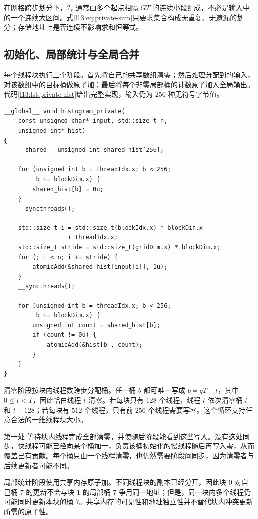 在网格跨步划分下，$\mathcal I_r$ 通常由多个起点相隔 $GT$ 的连续小段组成，不必是输入中的一个连续大区间。式\eqref{l13:eq:private-sum}只要求集合构成无重复、无遗漏的划分；存储地址上是否连续不影响求和恒等式。

\subsection{初始化、局部统计与全局合并}

每个线程块执行三个阶段。首先将自己的共享数组清零；然后处理分配到的输入，对该数组中的目标桶做原子加；最后将每个非零局部桶的计数原子加入全局输出。代码\ref{l13:lst:private-hist}给出完整实现，输入仍为 $256$ 种无符号字节值。

\noindent\begin{minipage}{\textwidth}
\begin{lstlisting}[caption={共享内存私有化的完整直方图核函数},label={l13:lst:private-hist}]
__global__ void histogram_private(
    const unsigned char* input, std::size_t n,
    unsigned int* hist)
{
    __shared__ unsigned int shared_hist[256];

    for (unsigned int b = threadIdx.x; b < 256;
         b += blockDim.x) {
        shared_hist[b] = 0u;
    }
    __syncthreads();

    std::size_t i = std::size_t(blockIdx.x) * blockDim.x
                  + threadIdx.x;
    std::size_t stride = std::size_t(gridDim.x) * blockDim.x;
    for (; i < n; i += stride) {
        atomicAdd(&shared_hist[input[i]], 1u);
    }
    __syncthreads();

    for (unsigned int b = threadIdx.x; b < 256;
         b += blockDim.x) {
        unsigned int count = shared_hist[b];
        if (count != 0u) {
            atomicAdd(&hist[b], count);
        }
    }
}
\end{lstlisting}
\end{minipage}

清零阶段按块内线程数跨步分配桶。任一桶 $b$ 都可唯一写成 $b=qT+t$，其中 $0\le t<T$，因此恰由线程 $t$ 清零。若每块只有 $128$ 个线程，线程 $t$ 依次清零桶 $t$ 和 $t+128$；若每块有 $512$ 个线程，只有前 $256$ 个线程需要写零。这个循环支持任意合法的一维线程块大小。

第一处 \mbox{} 等待块内线程完成全部清零，并使随后阶段能看到这些写入。没有这处同步，快线程可能已经向某个桶加一，负责该桶初始化的慢线程随后再写入零，从而覆盖已有贡献。每个桶只由一个线程清零，也仍然需要阶段间同步，因为清零者与后续更新者可能不同。

局部统计阶段使用共享内存原子加。不同线程块的副本已经分开，因此块 $0$ 对自己桶 $7$ 的更新不会与块 $1$ 的局部桶 $7$ 争用同一地址；但是，同一块内多个线程仍可能同时更新本块的桶 $7$。共享内存的可见性和地址独立性并不替代块内冲突更新所需的原子性。

